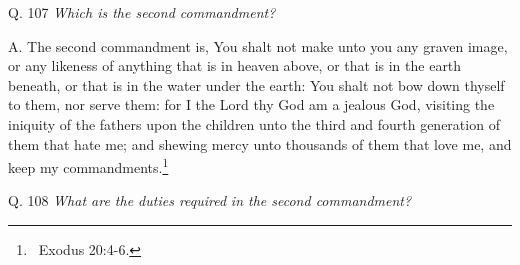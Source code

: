 {{{{{{{{{{{{{{{\bigskip

Q. 107 \textit{Which is the second commandment}\textit{?}

A. The second commandment is, You shalt not make unto you any graven image,
or any likeness of
anything that is in heaven above, or that is in the earth beneath, or that is in the water under the earth: You shalt not bow down thyself to them, nor serve them: for I the Lord thy God am a jealous God, visiting the iniquity of the fathers upon
the children unto the third and fourth generation of them that
hate me; and shewing mercy unto thousands of
them that love me, and keep my commandments.\footnote{\ Exodus 20:4-6.}


\bigskip

Q. 108 \textit{What are the duties required}\textit{ in the
second commandment}\textit{?}

}}}}}}}}}}}}}}}
